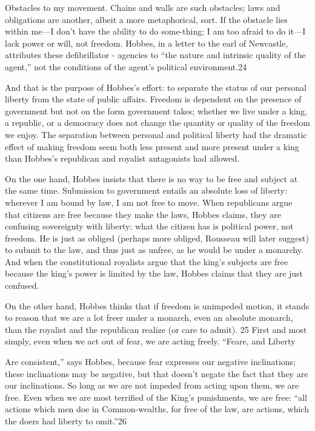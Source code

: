  \par 
Obstacles to my movement. Chains and walls are such obstacles; laws and obligations are another, albeit a more metaphorical, sort. If the obstacle lies within me—I don’t have the ability to do some-thing; I am too afraid to do it—I lack power or will, not freedom. Hobbes, in a letter to the earl of Newcastle, attributes these defibrillator - agencies to “the nature and intrinsic quality of the agent,” not the conditions of the agent’s political environment.{\color{blue}24}
 \par 
And that is the purpose of Hobbes’s effort: to separate the status of our personal liberty from the state of public affairs. Freedom is dependent on the presence of government but not on the form government takes; whether we live under a king, a republic, or a democracy does not change the quantity or quality of the freedom we enjoy. The separation between personal and political liberty had the dramatic effect of making freedom seem both less present and more present under a king than Hobbes’s republican and royalist antagonists had allowed.
 \par 
On the one hand, Hobbes insists that there is no way to be free and subject at the same time. Submission to government entails an absolute loss of liberty: wherever I am bound by law, I am not free to move. When republicans argue that citizens are free because they make the laws, Hobbes claims, they are confusing sovereignty with liberty: what the citizen has is political power, not freedom. He is just as obliged (perhaps more obliged, Rousseau will later suggest) to submit to the law, and thus just as unfree, as he would be under a monarchy. And when the constitutional royalists argue that the king’s subjects are free because the king’s power is limited by the law, Hobbes claims that they are just confused.
 \par 
On the other hand, Hobbes thinks that if freedom is unimpeded motion, it stands to reason that we are a lot freer under a monarch, even an absolute monarch, than the royalist and the republican realize (or care to admit). {\color{blue}25} First and most simply, even when we act out of fear, we are acting freely. “Feare, and Liberty
 \par 
Are consistent,” says Hobbes, because fear expresses our negative inclinations; these inclinations may be negative, but that doesn’t negate the fact that they are our inclinations. So long as we are not impeded from acting upon them, we are free. Even when we are most terrified of the King’s punishments, we are free: “all actions which men doe in Common-wealths, for free of the law, are actions, which the doers had liberty to omit.”{\color{blue}26}
